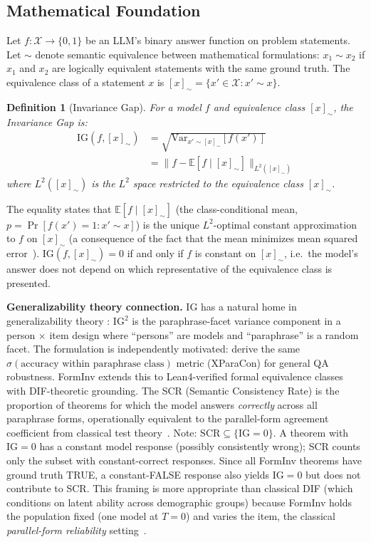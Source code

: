 \documentclass{article}
\newcommand{\IG}{\mathrm{IG}}
\newcommand{\Eclass}[1]{[#1]_{\sim}}
\newcommand{\Var}{\mathrm{Var}}
\newtheorem{definition}{Definition}
\begin{document}
\subsection{Mathematical Foundation}

Let $f: \mathcal{X} \to \{0,1\}$ be an LLM's binary answer function on problem statements.
Let $\sim$ denote semantic equivalence between mathematical formulations:
$x_1 \sim x_2$ if $x_1$ and $x_2$ are logically equivalent statements with the same ground truth.
The equivalence class of a statement $x$ is $\Eclass{x} = \{x' \in \mathcal{X} : x' \sim x\}$.

\begin{definition}[Invariance Gap]
For a model $f$ and equivalence class $\Eclass{x}$, the Invariance Gap is:
\begin{equation}
\begin{split}
\IG(f, \Eclass{x}) &= \sqrt{\Var_{x' \sim \Eclass{x}}[f(x')]} \\
                   &= \bigl\| f - \mathbb{E}[f \mid \Eclass{x}] \bigr\|_{L^2(\Eclass{x})}
\end{split}
\label{eq:ig}
\end{equation}
where $L^2(\Eclass{x})$ is the $L^2$ space restricted to the equivalence class $\Eclass{x}$.
\end{definition}

The equality states that $\mathbb{E}[f \mid \Eclass{x}]$ (the class-conditional mean,
$p = \Pr[f(x')=1 : x' \sim x]$) is the unique $L^2$-optimal constant approximation to $f$ on $\Eclass{x}$
(a consequence of the fact that the mean minimizes mean squared error~\citep{doob1953}).
$\IG(f, \Eclass{x}) = 0$ if and only if $f$ is constant on $\Eclass{x}$, i.e.\ the model's answer does not
depend on which representative of the equivalence class is presented.

\noindent\textbf{Generalizability theory connection.}
IG has a natural home in generalizability theory \citep{cronbach1972}:
$\IG^2$ is the paraphrase-facet variance component in a person $\times$ item design where
``persons'' are models and ``paraphrase'' is a random facet.
The formulation is independently motivated: \citet{choi2025roparq} derive the same
$\sigma(\text{accuracy within paraphrase class})$ metric (XParaCon) for general QA robustness.
FormInv extends this to Lean4-verified formal equivalence classes with DIF-theoretic grounding.
The SCR (Semantic Consistency Rate) is the proportion of theorems for which the model
answers \emph{correctly} across all paraphrase forms, operationally equivalent to the
parallel-form agreement coefficient from classical test theory~\citep{lord1968}.
Note: $\mathrm{SCR} \subseteq \{\mathrm{IG}=0\}$. A theorem with $\mathrm{IG}=0$ has a constant model
response (possibly consistently wrong); SCR counts only the subset with constant-correct responses.
Since all FormInv theorems have ground truth TRUE, a constant-FALSE response also yields $\mathrm{IG}=0$
but does not contribute to SCR.
This framing is more appropriate than classical DIF (which conditions on latent ability
across demographic groups) because FormInv holds the population fixed (one model at $T=0$)
and varies the item, the classical \emph{parallel-form reliability} setting~\citep{lord1968}.
\end{document}
